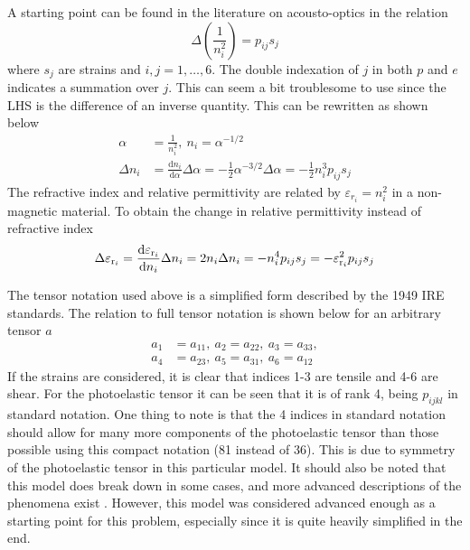 \documentclass[11pt,twoside]{eitExjobb}
\begin{document}
	A starting point can be found in the literature on acousto-optics in the relation \cite{Korpel1988}
	\begin{equation*}
		\Delta \left( \frac{1}{n_i^2} \right) = p_{ij} s_j
	\end{equation*}
	where $s_j$ are strains and $i,j = 1,\dotsc,6$. The double indexation of $j$ in both $p$ and $e$ indicates a summation over $j$. This can seem a bit troublesome to use since the LHS is the difference of an inverse quantity. This can be rewritten as shown below
	\begin{align*}
		\alpha &= \frac{1}{n_i^2},\ n_i = \alpha^{-1/2} \\
		\Delta n_i &= \frac{\mathrm{d}n_i}{\mathrm{d}\alpha} \Delta \alpha = -\frac{1}{2} \alpha^{-3/2} \Delta \alpha = -\frac{1}{2} n_i^3 p_{ij} s_j
	\end{align*}
	The refractive index and relative permittivity are related by $\varepsilon_{r_i} = n_i^2$ in a non-magnetic material. To obtain the change in relative permittivity instead of refractive index
	\begin{equation*}
		\Delta \varepsilon_{\mathrm{r}_i} = \frac{\mathrm{d}\varepsilon_{\mathrm{r}_i}}{\mathrm{d}n_i} \Delta n_i = 2n_i \Delta n_i = -n_i^4 p_{ij} s_j = -\varepsilon_{\mathrm{r}_i}^2 p_{ij} s_j
	\end{equation*}
	
	The tensor notation used above is a simplified form described by the 1949 IRE standards. The relation to full tensor notation is shown below for an arbitrary tensor $a$ \cite{Korpel1988}
	\begin{equation*}
	\begin{split}
		a_1 &= a_{11},\ a_2 = a_{22},\ a_3 = a_{33}, \\
		a_4 &= a_{23},\ a_5 = a_{31},\ a_6 = a_{12}
	\end{split}
	\end{equation*}
	If the strains are considered, it is clear that indices 1-3 are tensile and 4-6 are shear. For the photoelastic tensor it can be seen that it is of rank 4, being $p_{ijkl}$ in standard notation. One thing to note is that the 4 indices in standard notation should allow for many more components of the photoelastic tensor than those possible using this compact notation (81 instead of 36). This is due to symmetry of the photoelastic tensor in this particular model. \addref It should also be noted that this model does break down in some cases, and more advanced descriptions of the phenomena exist \cite{Nelson1971}. However, this model was considered advanced enough as a starting point for this problem, especially since it is quite heavily simplified in the end.
	
\end{document}
